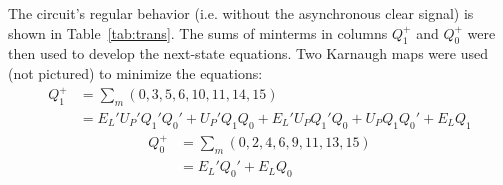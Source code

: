 \documentclass{report}
\begin{document}
The circuit's regular behavior (i.e. without the asynchronous clear signal) is shown in Table~\ref{tab:trans}.  The sums of minterms in columns $Q_1^+$ and $Q_0^+$ were then used to develop the next-state equations.  Two Karnaugh maps were used (not pictured) to minimize the equations:
%
\begin{align}
\label{q1}
  Q_1^+ &=  \sum_m(0,3,5,6,10,11,14,15) \nonumber\\
  &= E_L'U_P'Q_1'Q_0' + U_P'Q_1Q_0 + E_L'U_PQ_1'Q_0 + U_PQ_1Q_0' + E_LQ_1
\end{align}
%
\begin{align}
  \label{eq:D2}
  Q_0^+ &= \sum_m(0,2,4,6,9,11,13,15) \nonumber \\
  &= E_L'Q_0' + E_LQ_0
\end{align}
\end{document}
